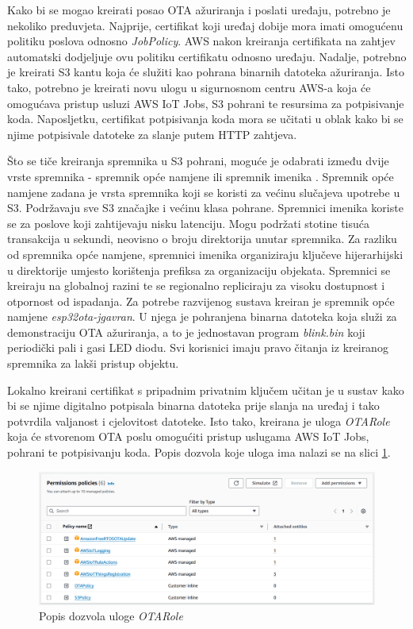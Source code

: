 Kako bi se mogao kreirati posao OTA ažuriranja i poslati uređaju, potrebno je nekoliko preduvjeta. Najprije, certifikat koji uređaj dobije mora imati omogućenu politiku poslova odnosno \textit{JobPolicy}. AWS nakon kreiranja certifikata na zahtjev automatski dodjeljuje ovu politiku certifikatu odnosno uređaju. Nadalje, potrebno je kreirati S3 kantu koja će služiti kao pohrana binarnih datoteka ažuriranja. Isto tako, potrebno je kreirati novu ulogu u sigurnosnom centru AWS-a koja će omogućava pristup usluzi AWS IoT Jobs, S3 pohrani te resursima za potpisivanje koda. Naposljetku, certifikat potpisivanja koda mora se učitati u oblak kako bi se njime potpisivale datoteke za slanje putem HTTP zahtjeva. 

Što se tiče kreiranja spremnika u S3 pohrani, moguće je odabrati između dvije vrste spremnika - spremnik opće namjene  ili spremnik imenika . Spremnik opće namjene zadana je vrsta spremnika koji se koristi za većinu slučajeva upotrebe u S3. Podržavaju sve S3 značajke i većinu klasa pohrane. Spremnici imenika koriste se za poslove koji zahtijevaju nisku latenciju. Mogu podržati stotine tisuća transakcija u sekundi, neovisno o broju direktorija unutar spremnika. Za razliku od spremnika opće namjene, spremnici imenika organiziraju ključeve hijerarhijski u direktorije umjesto korištenja prefiksa za organizaciju objekata. Spremnici se kreiraju na globalnoj razini te se regionalno repliciraju za visoku dostupnost i otpornost od ispadanja. Za potrebe razvijenog sustava kreiran je spremnik opće namjene \textit{esp32ota-jgavran}. U njega je pohranjena binarna datoteka koja služi za demonstraciju OTA ažuriranja, a to je jednostavan program \textit{blink.bin} koji periodički pali i gasi LED diodu. Svi korisnici imaju pravo čitanja iz kreiranog spremnika za lakši pristup objektu. 

Lokalno kreirani certifikat s pripadnim privatnim ključem učitan je u sustav kako bi se njime digitalno potpisala binarna datoteka prije slanja na uređaj i tako potvrdila valjanost i cjelovitost datoteke. Isto tako, kreirana je uloga \textit{OTARole} koja će stvorenom OTA poslu omogućiti pristup uslugama AWS IoT Jobs, pohrani te potpisivanju koda. Popis dozvola koje uloga ima nalazi se na slici \ref{fig:otarole}.

\begin{figure}[ht]
	\centering
	\includegraphics[scale=0.4]{imgs/otarole}
	\caption{Popis dozvola uloge \textit{OTARole}}
	\label{fig:otarole}
\end{figure}

